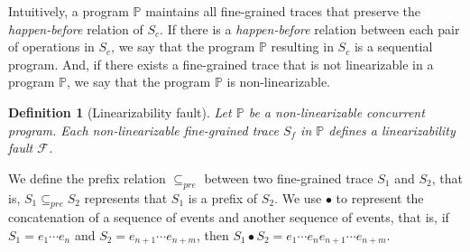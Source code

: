 \documentclass[runningheads]{llncs}
\newcommand{\p}{\mathbb{P} }
\newtheorem{myDef}{Definition}
\begin{document}
Intuitively, a program $\mathbb{P}$ maintains all %
fine-grained traces that preserve the \textit{happen-before} relation of $S_c$.
If there is a \textit{happen-before} relation between each pair of operations in $S_c$, we say that the program $\p$ resulting in $S_c$ is a sequential program.
And, if there exists a fine-grained trace that is not linearizable in a program $\p$, we say that the program $\p$ is non-linearizable.

\begin{myDef}[Linearizability fault]
Let $\p$ be a non-linearizable concurrent program. Each non-linearizable fine-grained trace $S_f$ in $\p$ defines a \textit{linearizability fault} $\mathcal{F}$.
\end{myDef}

We define the prefix relation $\subseteq_{pre}$ between two fine-grained trace $S_1$ and $S_2$, that is, $S_1\subseteq_{pre} S_2$ represents that $S_1$ is a prefix of $S_2$. We use $\bullet$ to represent the concatenation of a sequence of events and another sequence of events, that is, if $S_1=e_1\cdots e_n$ and $S_2 = e_{n+1}\cdots e_{n+m}$, then $S_1\bullet S_2 = e_1\cdots e_n e_{n+1}\cdots e_{n+m}$.
\end{document}
